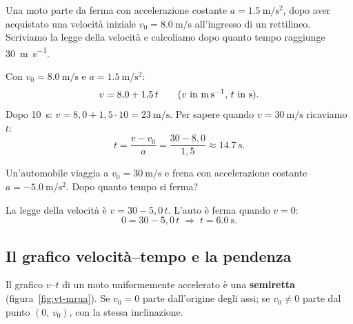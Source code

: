 \begin{testexample}
Una moto parte da ferma con accelerazione costante $a = \SI{1,5}{\metre\per\second\squared}$, dopo aver acquistato una velocità iniziale $v_0 = \SI{8,0}{\metre\per\second}$ all'ingresso di un rettilineo. Scriviamo la legge della velocità e calcoliamo dopo quanto tempo raggiunge \SI{30}{\metre\per\second}.

Con $v_0 = \SI{8,0}{\metre\per\second}$ e $a = \SI{1,5}{\metre\per\second\squared}$:
\[ v = 8{,}0 + 1{,}5\,t \qquad (\text{$v$ in \si{\metre\per\second}, $t$ in \si{\second}}). \]
Dopo \SI{10}{\second}: $v = 8{,}0 + 1{,}5 \cdot 10 = \SI{23}{\metre\per\second}$.
Per sapere quando $v = \SI{30}{\metre\per\second}$ ricaviamo $t$:
\[ t = \frac{v - v_0}{a} = \frac{30 - 8{,}0}{1{,}5} \approx \SI{14,7}{\second}. \]
\end{testexample}

\begin{testexample}
Un'automobile viaggia a $v_0 = \SI{30}{\metre\per\second}$ e frena con accelerazione costante $a = \SI{-5,0}{\metre\per\second\squared}$. Dopo quanto tempo si ferma?

La legge della velocità è $v = 30 - 5{,}0\,t$. L'auto è ferma quando $v = 0$:
\[ 0 = 30 - 5{,}0\,t \;\Longrightarrow\; t = \SI{6,0}{\second}. \]
\end{testexample}

\subsection{Il grafico velocità--tempo e la pendenza}
Il grafico $v$--$t$ di un moto uniformemente accelerato è una \textbf{semiretta} (figura~\ref{fig:vt-mrua}). Se $v_0 = 0$ parte dall'origine degli assi; se $v_0 \neq 0$ parte dal punto $(0,\,v_0)$, con la stessa inclinazione.

